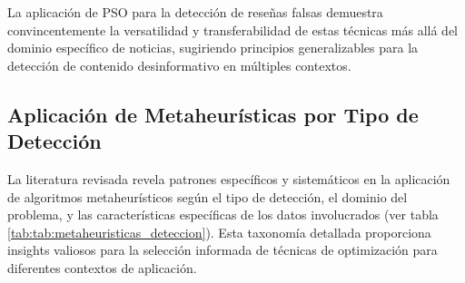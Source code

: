 La aplicación de PSO para la detección de reseñas falsas \cite{deshai2023unmasking} demuestra convincentemente la versatilidad y transferabilidad de estas técnicas más allá del dominio específico de noticias, sugiriendo principios generalizables para la detección de contenido desinformativo en múltiples contextos.

\subsection{Aplicación de Metaheurísticas por Tipo de Detección}
\label{subsec:metaheuristicas_por_tipo}

La literatura revisada revela patrones específicos y sistemáticos en la aplicación de algoritmos metaheurísticos según el tipo de detección, el dominio del problema, y las características específicas de los datos involucrados (ver tabla \ref{tab:tab:metaheuristicas_deteccion}). Esta taxonomía detallada proporciona insights valiosos para la selección informada de técnicas de optimización para diferentes contextos de aplicación.

